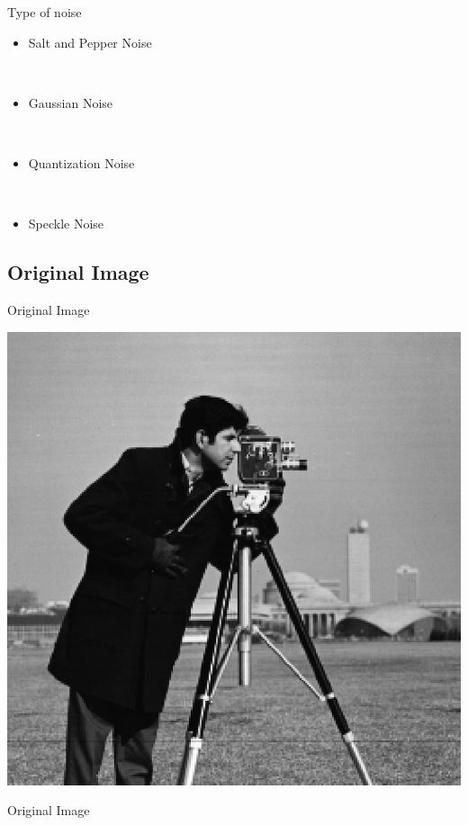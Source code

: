 \documentclass{beamer}
\begin{document}
\begin{frame}{Type of noise}


\begin{itemize}
	\item Salt and Pepper Noise
	


	
	\
	
	\item  Gaussian Noise
	
	
	\
	
	\item Quantization Noise
	
    \
    
    \item Speckle Noise


\end{itemize}

\end{frame}


\subsection{Original Image}
\begin{frame}{Original Image}

\vspace{1cm}
\begin{center}

    \includegraphics[width=0.4\columnwidth]{images/salt_pepper_origin.jpg}
	
	Original Image



\end{center}

\end{frame}
\end{document}
